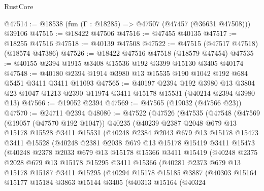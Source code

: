 \begin{lexlean}{RustCore}
\begin{coremodule}
@47514 := @18538 (fun (Γ : @18285) => @47507 (@47457 (@36631 @47508))) @39106
@47515 := @18422 @47506
@47516 := @47455 @40135
@47517 := @18255 @47516
@47518 := @40139 @47508
@47522 := @47515 (@47517 @47518) (@18574 @47386)
@47526 := @18422 @47516 @47518 (@18579 @47454)
@47535 := @40155 @2394 @1915 @3408 @15536 @192 @3399 @15130 @3405 @40174
@47548 := @40180 @2394 @1914 @3980 @13 @15535 @190 @1042 @192 @684 @5451 @3411 @3411 @11093
@47565 := @40197
    @2394
    @192
    @3980
    @13
    @3804
    @23
    @1047
    @1213
    @2390
    @11974
    @3411
    @15178
    @15531
    (@40214 @2394 @3980 @13)
@47566 := @19052 @2394
@47569 := @47565 (@19032 (@47566 @23))
@47570 := @24711 @2394
@48080 := @47522
    (@47526
      (@47535
        (@47548
          (@47569
            (@19057 (@47570 @192 @1047))
            @40235
            (@40239
              @2387
              @2048
              @679
              @13
              @15178
              @15528
              @3411
              @15531
              (@40248
                @2384
                @2043
                @679
                @13
                @15178
                @15473
                @3411
                @15528
                (@40248
                  @2381
                  @2038
                  @679
                  @13
                  @15178
                  @15419
                  @3411
                  @15473
                  (@40248
                    @2378
                    @2033
                    @679
                    @13
                    @15178
                    @15366
                    @3411
                    @15419
                    (@40248
                      @2375
                      @2028
                      @679
                      @13
                      @15178
                      @15295
                      @3411
                      @15366
                      (@40281
                        @2373
                        @679
                        @13
                        @15178
                        @15187
                        @3411
                        @15295
                        (@40294
                          @15178
                          @15185
                          @3887
                          (@40303
                            @15164
                            @15177
                            @15184
                            @3863
                            @15144
                            @3405
                            (@40313
                              @15164
                              (@40324

\end{coremodule}
\end{lexlean}
